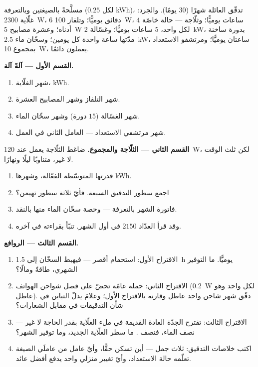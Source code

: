\begin{problem}\label{pb:g9:electric-power-energy:1}
مسلَّحةً بالصيغتين وبالتعرفة ($0.25$ لكل \unit{kWh})، تدقّق
العائلة شهرًا (30 يومًا). والجرد: غلّاية \qty{2300}{W}، $6$
دقائق يوميًّا؛ وتلفاز \qty{100}{W}، $4$ ساعات يوميًّا؛ وثلّاجة
--- حالة خاصّة أدناه؛ وعشرة مصابيح \qty{5}{W} لكل واحد، $5$
ساعات يوميًّا؛ وغسّالة \qty{2}{kW}، بدورة ساخنة مدّتها ساعة
واحدة كل يومين؛ وسخّان ماء \qty{2.5}{kW}، ساعتان يوميًّا؛
ومرتشفو الاستعداد بمجموع \qty{10}{W}، يعملون دائمًا.

\medskip\noindent\textbf{القسم الأول --- آلةً آلة.}
\begin{enumerate}
  \item شهر الغلّاية،  \unit{kWh}.
  \item شهر التلفاز وشهر المصابيح العشرة.
  \item شهر الغسّالة ($15$ دورة) وشهر سخّان الماء.
  \item شهر مرتشفي الاستعداد --- العامل الثاني في العمل.
\end{enumerate}

\medskip\noindent\textbf{القسم الثاني --- الثلّاجة
والمجموع.}
ضاغط الثلّاجة يعمل عند \qty{120}{W}، لكن ثلث الوقت لا غير،
متناوبًا ليلًا ونهارًا.
\begin{enumerate}[resume]
  \item قدرتها المتوسّطة الفعّالة، وشهرها  \unit{kWh}.
  \item اجمع سطور التدقيق السبعة. فأيّ ثلاثة سطور تهيمن؟
  \item فاتورة الشهر بالتعرفة --- وحصة سخّان الماء منها
        بالنقد.
  \item وقد قرأ العدّاد $2150$  في أول الشهر. تنبّأ
        بقراءته في آخره.
\end{enumerate}

\medskip\noindent\textbf{القسم الثالث --- الروافع.}
\begin{enumerate}[resume]
  \item الاقتراح الأول: استحمام أقصر --- فيهبط السخّان إلى
        \qty{1.5}{h} يوميًّا. ما التوفير الشهري، طاقةً
        ومالًا؟
  \item الاقتراح الثاني: حملة عامّة تحضّ على فصل شواحن
        الهواتف (\qty{0.2}{W} لكل واحد وهو عاطل). دقّق شهر
        شاحن واحد عاطل وقارنه بالاقتراح الأول؛ وعلامَ يدلّ
        التباين في شأن التدقيقات في مقابل الشعارات؟
  \item الاقتراح الثالث: تقترح الجدّة العادة القديمة في ملء
        الغلّاية بقدر الحاجة لا غير --- نصف الماء، فنصف
        . ما سطر الغلّاية الجديد، وما توفير الشهر؟
  \item اكتب خلاصات التدقيق: ثلاث جمل --- أين تسكن  حقًّا، وأيّ عامل من عاملَي الصيغة تعلّمه حالة
        الاستعداد، وأيّ تغيير منزلي واحد يدفع أفضل عائد.
\end{enumerate}
\end{problem}
